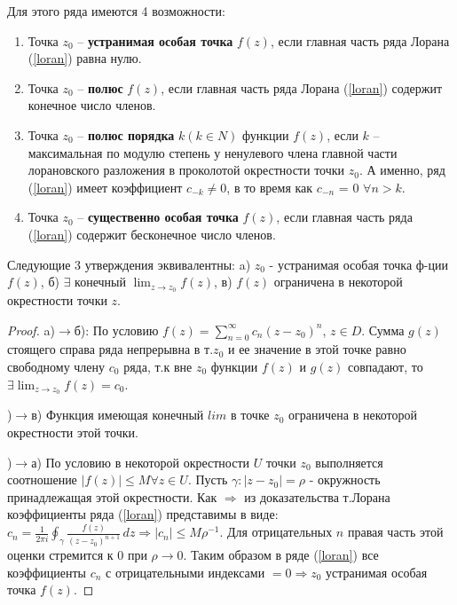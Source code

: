Для этого ряда имеются 4 возможности:
\begin{enumerate}
    \item Точка $z_0$ – \textbf{устранимая особая точка} $f(z)$, если главная часть ряда Лорана (\ref{loran}) равна нулю.
    \item Точка $z_0$ – \textbf{полюс} $f(z)$, если главная часть ряда Лорана (\ref{loran}) содержит конечное число членов.    
    \item Точка $z_0$ – \textbf{полюс порядка} $k (k \in N)$ функции $f(z)$, если $k$
– максимальная по модулю степень у ненулевого члена главной части лорановского разложения в проколотой окрестности точки $z_0$. А именно, ряд (\ref{loran}) имеет коэффициент $c_{-k}\neq 0$,
в то время как $c_{-n}$ = 0 $\forall n > k$.
    \item Точка $z_0$ – \textbf{существенно особая точка} $f(z)$, если
главная часть ряда (\ref{loran}) содержит бесконечное число членов.
\end{enumerate}
\begin{theorem}
   Следующие 3 утверждения эквивалентны: a) $z_0$ - устранимая особая точка ф-ции $f(z)$, б) $\exists$ конечный $\displaystyle\lim_{z\rightarrow z_0}f(z)$, в) $f(z)$ ограничена в некоторой окрестности точки $z$.
\end{theorem}
\begin{proof}
    a)$\rightarrow$б): По условию $f(z)=\sum_{n=0}^{\infty}c_n(z-z_0)^n$, $z \in D$. Сумма $g(z)$ стоящего справа ряда непрерывна в т.$z_0$ и ее значение в этой точке равно свободному члену $c_0$ ряда, т.к вне $z_0$ функции $f(z)$ и $g(z)$ совпадают, то $\exists \displaystyle\lim_{z\rightarrow z_0}f(z)=c_0$.
    
    )$\rightarrow$в) Функция имеющая конечный $lim$ в точке $z_0$ ограничена в некоторой окрестности этой точки.

    )$\rightarrow$а) По условию в некоторой окрестности $U$ точки $z_0$ выполняется соотношение $|f(z)|\leq M \forall z \in U$. Пусть $\gamma:|z-z_0|=\rho$ - окружность принадлежащая этой окрестности. Как $\Rightarrow$ из доказательства т.Лорана коэффициенты ряда (\ref{loran}) представимы в виде: $c_n = \frac{1}{2\pi i} \oint_{\gamma} \frac{f(z)}{(z-z_0)^{n+1}} \,dz \Rightarrow |c_n|\leq M\rho^{-1}$. Для отрицательных $n$ правая часть этой оценки стремится к 0 при $\rho \rightarrow 0$. Таким образом в ряде (\ref{loran}) все коэффициенты $c_n$ с отрицательными индексами $=0\Rightarrow z_0$ устранимая особая точка $f(z)$. 
\end{proof}

